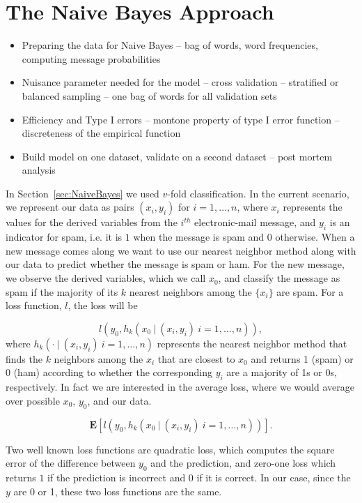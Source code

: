 \section{The Naive Bayes Approach}

\begin{itemize}
\item Preparing the data for Naive Bayes -- bag of words, word 
frequencies, computing message probabilities
\item Nuisance parameter needed for the model -- cross validation
-- stratified or balanced sampling
-- one bag of words for all validation sets
\item Efficiency and Type I errors
-- montone property of type I error function
-- discreteness of the empirical function
\item Build model on one dataset, validate on a second dataset
-- post mortem analysis
\end{itemize}

In Section~\ref{sec:NaiveBayes} we used $v$-fold 
classification. 
In the current scenario, we represent our data 
as pairs $(x_i, y_i)$ for $i= 1, \ldots , n$, 
where $x_i$ represents the values for the derived 
variables from the $i^{th}$ electronic-mail message, 
and $y_i$ is an indicator for spam, i.e. it is $1$ 
when the message is spam and 0 otherwise.
When a new message comes along we want to use our
nearest neighbor method along with our data to
predict whether the message is spam or ham.
For the new message, we observe the derived variables,
which we call $x_0$, and classify the message as spam
if the majority of its $k$ nearest neighbors among
the $\{x_i\}$ are spam.
For a loss function, ${l}$, the loss will be

$$  {l}(y_0 , h_k(x_0 ~| ~(x_i , y_i)~ i=1, \ldots , n) ),$$
where $h_k( \cdot ~| ~(x_i , y_i)~ i=1, \ldots , n)$
represents the nearest neighbor method that finds the $k$ neighbors
among the $x_i$ that are closest to $x_0$ and returns 1 (spam) or 0
(ham) according to whether the corresponding $y_i$ are a majority
of 1s or 0s, respectively.
In fact we are interested in the average loss, where
we would average over possible $x_0$, $y_0$, and our data.

$$  \textbf{E} [ {l}(y_0 , h_k(x_0 ~| ~(x_i , y_i)~ i=1, \ldots , n) )].$$

Two well known loss functions are quadratic loss, which computes
the square error of the difference between $y_0$ and the prediction,
and zero-one loss which returns $1$ if the prediction is incorrect
and 0 if it is correct. In our case, since the $y$ are 0 or 1, 
these two loss functions are the same.


